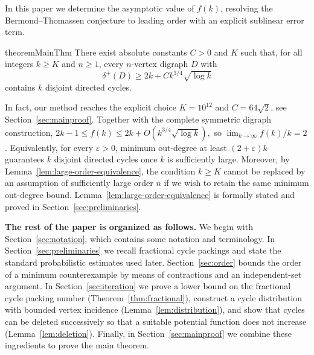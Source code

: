 \documentclass[10pt,a4paper]{article}
\newtheorem{theorem}{Theorem}[section]
\numberwithin{equation}{section}
\newcommand{\jbjcomment}[1]{\textcolor{blue}{JBJ: #1}}
\begin{document}
\medskip
In this paper we determine the asymptotic value of $f(k)$, resolving
the Bermond--Thomassen conjecture to leading order with an explicit
sublinear error term.%


\begin{restatable}{theorem}{MainThm}\label{thm:main}
    There exist absolute constants $C>0$ and $K$ such that, for all
integers $k\ge K$ and $n\ge1$, every $n$-vertex digraph $D$ with
$$
\delta^+(D)\ge 2k+Ck^{3/4}\sqrt{\log k}
$$
contains $k$ disjoint directed cycles.
\end{restatable}

In fact, our method reaches the explicit choice
$K=10^{12}$ and $C=64\sqrt2$, see Section~\ref{sec:mainproof}.   Together with the complete symmetric digraph construction,
$ 2k-1\le f(k)\le 2k+O\!\left(k^{3/4}\sqrt{\log k}\right), $
so $\lim_{k\to\infty}f(k)/k=2$. Equivalently, for every $\varepsilon>0$, minimum out-degree at least $(2+\varepsilon)k$ guarantees $k$ disjoint directed cycles once $k$ is sufficiently large. Moreover, by Lemma~\ref{lem:large-order-equivalence}, the condition $k\ge K$ cannot be replaced by an assumption of sufficiently large order $n$ if we wish to retain the same minimum out-degree bound.  Lemma~\ref{lem:large-order-equivalence} is formally stated and proved in Section~\ref{sec:preliminaries}.

\bigskip
\textbf{The rest of the paper is organized as follows.}
We begin with Section~\ref{sec:notation}, which contains some notation and terminology.
In Section~\ref{sec:preliminaries} we recall fractional cycle packings and state the standard probabilistic estimates used later. 
Section~\ref{sec:order} bounds the order of a minimum counterexample
by means of contractions and an independent-set argument.
In Section~\ref{sec:iteration} we prove a lower bound on the fractional
cycle packing number (Theorem~\ref{thm:fractional}), construct a cycle
distribution with bounded vertex incidence
(Lemma~\ref{lem:distribution}), and show that cycles can be deleted
successively so that a suitable potential function does not increase
(Lemma~\ref{lem:deletion}). Finally, in Section~\ref{sec:mainproof} we
combine these ingredients to prove the main theorem.
\end{document}
